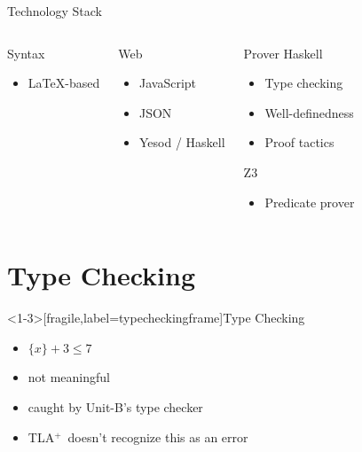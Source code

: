 \documentclass[11pt]{beamer}
\newcommand{\unitb}{Unit-B\xspace}
\newcommand{\tla}{TLA${}^+$\xspace}
\begin{document}
\begin{frame}[fragile]{Technology Stack}
  \begin{columns}[T,onlytextwidth]
      \begin{block}{Syntax}
        \begin{itemize}
        \item \textrm{\LaTeX}-based
        \end{itemize}
      \end{block}
      \pause
      \begin{block}{Web}
        \begin{itemize}
        \item JavaScript
        \item JSON
        \item Yesod / Haskell
        \end{itemize}
      \end{block}
      \pause

      \begin{block}{Prover}
        Haskell
        \begin{itemize}
        \item Type checking
        \item Well-definedness
        \item Proof tactics
        \end{itemize}
        Z3
        \begin{itemize}
        \item Predicate prover
        \end{itemize}
      \end{block}
  \end{columns}
\end{frame}


\section{Type Checking}

\begin{frame}<1-3>[fragile,label=typecheckingframe]{Type Checking}
  \begin{itemize}
  \item <1-> $\{x\}+3 \le 7$
  \item <2-> not meaningful
  \item <3-> caught by \unitb's type checker
  \item <4-> \tla\ doesn't recognize this as an error
  \end{itemize}
\end{frame}
\end{document}
